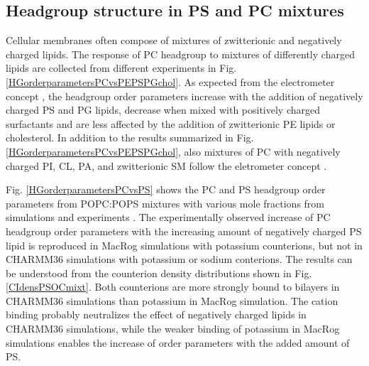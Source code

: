 \documentclass[aps,prl,superscriptaddress,twocolumn]{revtex4}
\begin{document}
\subsection{Headgroup structure in PS and PC mixtures}
Cellular membranes often compose of mixtures of zwitterionic and negatively
charged lipids. The response of PC headgroup to mixtures of differently charged
lipids are collected from different experiments in Fig. \ref{HGorderparametersPCvsPEPSPGchol}.
As expected from the electrometer concept \cite{seelig87}, the headgroup 
order parameters increase with the addition of negatively charged PS and PG lipids,
decrease when mixed with positively charged surfactants and
are less affected by the addition of zwitterionic PE lipids or cholesterol.
In addition to the results summarized in Fig. \ref{HGorderparametersPCvsPEPSPGchol},
also mixtures of PC with negatively charged PI, CL, PA, and zwitterionic SM
follow the eletrometer concept \cite{scherer87}.


Fig. \ref{HGorderparametersPCvsPS} shows the PC and PS headgroup order parameters
from POPC:POPS mixtures with various mole fractions from 
simulations and experiments \cite{scherer87,roux90}.
The experimentally observed increase of PC headgroup order parameters with the increasing
amount of negatively charged PS lipid is reproduced in
MacRog simulations with potassium counterions, but not in CHARMM36 simulations
with potassium or sodium conterions. The results can be
understood from the counterion density distributions shown in Fig. \ref{CIdensPSOCmixt}.
Both counterions are more strongly bound to bilayers in
CHARMM36 simulations than potassium in MacRog simulation.
The cation binding probably neutralizes the effect of negatively
charged lipids in CHARMM36 simulations, while the
weaker binding of potassium in MacRog simulations enables the
increase of order parameters with the added amount of PS.

\end{document}
